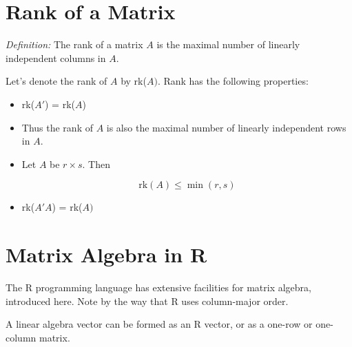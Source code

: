 \section{Rank of a Matrix}

{\it Definition:}  The rank of a matrix $A$ is the maximal number of
linearly independent columns in $A$.

Let's denote the rank of $A$ by rk($A)$.  Rank has the following
properties:

\begin{itemize}

\item rk($A'$)  = rk($A$)

\item Thus the rank of $A$ is also the maximal number of linearly
independent rows in $A$.

\item Let $A$ be $r \times s$.  Then

\begin{equation}
\textrm{rk}(A) \leq \min(r,s)
\end{equation}

\item rk($A'A$) = rk($A)$

\end{itemize}

\section{Matrix Algebra in R}

The R programming language has extensive facilities for matrix algebra,
introduced here.  Note by the way that R uses column-major order.

A linear algebra vector can be formed as an R vector, or as a one-row or
one-column matrix.

